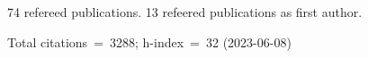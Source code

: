 74 refereed publications. 13 refeered publications as first author.

Total citations~=~3288; h-index~=~32 (2023-06-08)